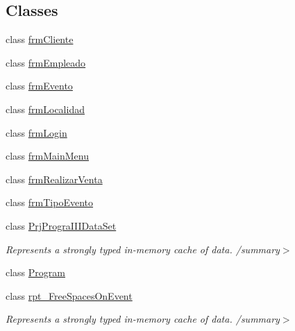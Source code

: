 \subsection*{Classes}
\begin{DoxyCompactItemize}
\item 
class \hyperlink{classprj_progra_i_i_i_1_1frm_cliente}{frm\+Cliente}
\item 
class \hyperlink{classprj_progra_i_i_i_1_1frm_empleado}{frm\+Empleado}
\item 
class \hyperlink{classprj_progra_i_i_i_1_1frm_evento}{frm\+Evento}
\item 
class \hyperlink{classprj_progra_i_i_i_1_1frm_localidad}{frm\+Localidad}
\item 
class \hyperlink{classprj_progra_i_i_i_1_1frm_login}{frm\+Login}
\item 
class \hyperlink{classprj_progra_i_i_i_1_1frm_main_menu}{frm\+Main\+Menu}
\item 
class \hyperlink{classprj_progra_i_i_i_1_1frm_realizar_venta}{frm\+Realizar\+Venta}
\item 
class \hyperlink{classprj_progra_i_i_i_1_1frm_tipo_evento}{frm\+Tipo\+Evento}
\item 
class \hyperlink{classprj_progra_i_i_i_1_1_prj_progra_i_i_i_data_set}{Prj\+Progra\+I\+I\+I\+Data\+Set}
\begin{DoxyCompactList}\small\item\em Represents a strongly typed in-\/memory cache of data. /summary$>$ \end{DoxyCompactList}\item 
class \hyperlink{classprj_progra_i_i_i_1_1_program}{Program}
\item 
class \hyperlink{classprj_progra_i_i_i_1_1rpt___free_spaces_on_event}{rpt\+\_\+\+Free\+Spaces\+On\+Event}
\begin{DoxyCompactList}\small\item\em Represents a strongly typed in-\/memory cache of data. /summary$>$ \end{DoxyCompactList}\end{DoxyCompactItemize}
